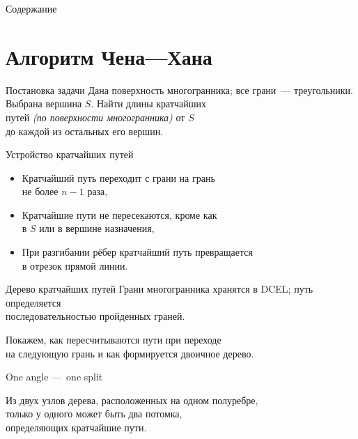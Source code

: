 \documentclass[12pt,aspectratio=169,svgnames]{beamer}
\begin{document}
 \maketitle

\begin{frame}{Содержание}
	\tableofcontents
\end{frame}

\section{Алгоритм Чена—Хана}

\begin{frame}{Постановка задачи}
	Дана поверхность многогранника; все грани~— треугольники.\\
	Выбрана вершина \(S\). Найти длины кратчайших \\
	путей {\it (по поверхности многогранника)} от \(S\) \\
	до каждой из остальных его вершин.
\end{frame}


\begin{frame}{Устройство кратчайших путей}
   \begin{itemize}
	\item Кратчайший путь переходит с грани на грань\\
		не более \(n-1\) раза,\medskip
	\item Кратчайшие пути не пересекаются, кроме как\\
		в \(S\) или в вершине назначения,\medskip
	\item При разгибании рёбер кратчайший путь превращается\\
		в отрезок прямой линии.
   \end{itemize}
\end{frame}


\begin{frame}{Дерево кратчайших путей}
	Грани многогранника хранятся в DCEL; путь определяется\\
	последовательностью пройденных граней.

	Покажем, как пересчитываются пути при переходе\\
	на следующую грань и как формируется двоичное дерево.
\end{frame}


\begin{frame}{One angle — one split}
   \begin{lm}
	Из двух узлов дерева, расположенных на одном полуребре,\\
	только у одного может быть два потомка,\\
	определяющих кратчайшие пути.
   \end{lm}
\end{frame}
\end{document}
